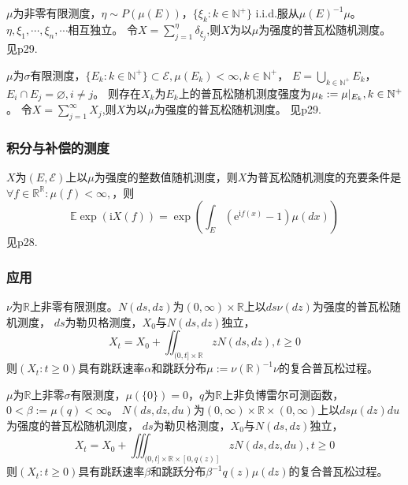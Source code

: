 \documentclass[main]{subfiles}
\begin{document}
\begin{theorem}\label{the:普瓦松随机测度的存在性}
  \(\mu\)为非零有限测度，\(\eta \sim P(\mu(E))\)，\(\{\xi_k:k \in \mathbb{N}^+\}\) i.i.d.服从\(\mu(E)^{-1}\mu\)。\(\eta,\xi_1,\cdots,\xi_n,\cdots\)相互独立。
  令\(X=\sum_{j=1}^{\eta} \delta_{\xi_j}\),则\(X\)为以\(\mu\)为强度的普瓦松随机测度。
  见p29.
\end{theorem}
\begin{theorem}\label{the:1.5.5}
  \(\mu\)为\(\sigma\)有限测度，\(\{E_k:k \in \mathbb{N}^+\}\subset \mathcal{E},\mu(E_k)<\infty,k \in \mathbb{N}^+\)，
  \(E=\bigcup_{k \in \mathbb{N}^+}E_k\)，\(E_i \cap E_j=\varnothing,i \neq j\)。
  则存在\(X_k\)为\(E_k\)上的普瓦松随机测度强度为\(\mu_k:=\mu|_{E_k},k \in \mathbb{N}^+\)。
  令\(X=\sum_{j=1}^{\infty} X_j\),则\(X\)为以\(\mu\)为强度的普瓦松随机测度。
  见p29.
\end{theorem}
\subsubsection{积分与补偿的测度}
\begin{theorem}\label{the:普瓦松随机测度的充要条件2}
  \(X\)为\((E,\mathcal{E})\)上以\(\mu\)为强度的整数值随机测度，则\(X\)为普瓦松随机测度的充要条件是
  \(\forall f \in \mathbb{R}^{\mathbb{R}}:\mu(f)< \infty ,\)，则\[
    \mathbb{E}\exp(\mathrm{i}X(f))=\exp(\int_{E}(\mathrm{e}^{\mathrm{i}f(x)}-1)\mu(dx))
  \]
  见p28.
\end{theorem}
\subsubsection{应用}
\begin{theorem}\label{the:复合普瓦松过程构造}
  \(\nu\)为\(\mathbb{R}\)上非零有限测度。\(N(ds,dz)\)为\((0,\infty)\times \mathbb{R}\)上以\(ds \nu(dz)\)为强度的普瓦松随机测度，
  \(ds\)为勒贝格测度，\(X_0\)与\(N(ds,dz)\)独立，\[
    X_t=X_0 + \iint_{(0,t]\times \mathbb{R}}z N(ds,dz),t \geq 0
  \]
  则\((X_t:t \geq 0)\)具有跳跃速率\(\alpha\)和跳跃分布\(\mu:=\nu(\mathbb{R})^{-1}\nu\)的复合普瓦松过程。
\end{theorem}
\begin{theorem}\label{the:复合普瓦松过程构造2}
  \(\mu\)为\(\mathbb{R}\)上非零\(\sigma\)有限测度，\(\mu(\{0\})=0\)，\(q\)为\(\mathbb{R}\)上非负博雷尔可测函数，\(0 < \beta :=\mu(q)<\infty\)。
  \(N(ds,dz,du)\)为\((0,\infty)\times \mathbb{R}\times(0,\infty)\)上以\(ds \mu(dz)du\)为强度的普瓦松随机测度，
  \(ds\)为勒贝格测度，\(X_0\)与\(N(ds,dz)\)独立，\[
    X_t=X_0 + \iiint_{(0,t]\times \mathbb{R}\times[0,q(z)]}z N(ds,dz,du),t \geq 0
  \]
  则\((X_t:t \geq 0)\)具有跳跃速率\(\beta\)和跳跃分布\(\beta^{-1}q(z)\mu(dz)\)的复合普瓦松过程。
\end{theorem}
\homework[5]

\ifSubfilesClassLoaded{%
  \printindex }{%
}
\end{document}
